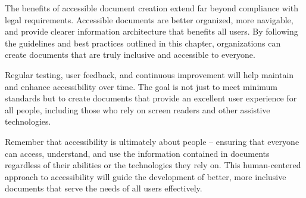 The benefits of accessible document creation extend far beyond compliance with legal requirements. Accessible documents are better organized, more navigable, and provide clearer information architecture that benefits all users. By following the guidelines and best practices outlined in this chapter, organizations can create documents that are truly inclusive and accessible to everyone.

Regular testing, user feedback, and continuous improvement will help maintain and enhance accessibility over time. The goal is not just to meet minimum standards but to create documents that provide an excellent user experience for all people, including those who rely on screen readers and other assistive technologies.

Remember that accessibility is ultimately about people – ensuring that everyone can access, understand, and use the information contained in documents regardless of their abilities or the technologies they rely on. This human-centered approach to accessibility will guide the development of better, more inclusive documents that serve the needs of all users effectively.
